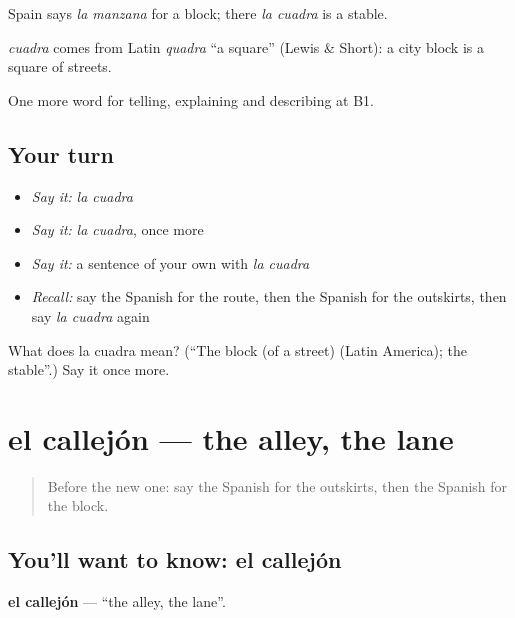 Spain says \emph{la manzana} for a block; there \emph{la cuadra} is a stable.

\begin{cousinweb}
\emph{cuadra} comes from Latin \emph{quadra} \textquotedblleft{}a square\textquotedblright{} (Lewis \& Short): a city block is a square of streets.
\end{cousinweb}

\begin{grammarlens}[title={What you've built}]
One more word for telling, explaining and describing at B1.
\end{grammarlens}

\subsection*{Your turn}
\begin{itemize}
\raggedright
  \item \emph{Say it:} \emph{la cuadra}
  \item \emph{Say it:} \emph{la cuadra}, once more
  \item \emph{Say it:} a sentence of your own with \emph{la cuadra}
  \item \emph{Recall:} say the Spanish for the route, then the Spanish for the outskirts, then say \emph{la cuadra} again
\end{itemize}

\begin{tcolorbox}[breakable,colback=teal!4,colframe=teal!35!black,title={Before you move on}]
What does la cuadra mean? (\textquotedblleft{}The block (of a street) (Latin America); the stable\textquotedblright{}.) Say it once more.
\end{tcolorbox}
\section[el callejón]{el callejón — the alley, the lane}

\label{lesson:ES-C675-callejon}



\begin{quote}
Before the new one: say the Spanish for the outskirts, then the Spanish for the block.
\end{quote}

\subsection*{You'll want to know: el callejón}
\textbf{el callejón} — \textquotedblleft{}the alley, the lane\textquotedblright{}.

